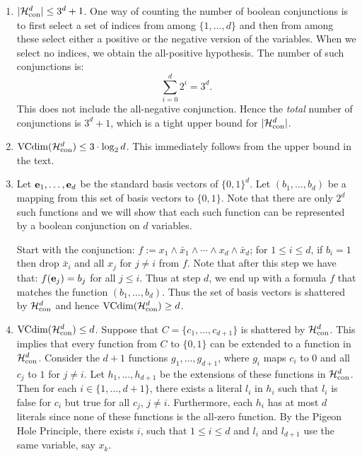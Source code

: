 \begin{enumerate}
    \item $|\mathcal{H}_{\text{con}}^{d}| \leq 3^d + 1$. One way of counting the number of boolean
        conjunctions is to first select a set of indices from among
        $\{1, \ldots, d\}$ and then from among these select either a positive
        or the negative version of the variables. When we select no indices,
        we obtain the all-positive hypothesis. The number of such conjunctions
        is:
        \[
                \sum_{i = 0}^{d} 2^i = 3^d.
        \]
        This does not include the all-negative conjunction. Hence the \emph{total}
        number of conjunctions is $3^d + 1$, which is a tight upper  bound for
        $|\mathcal{H}_{\text{con}}^{d}|$.

    \item $\text{VCdim} (\mathcal{H}_{\text{con}}^{d}) \leq 3 \cdot \log_2 d$. This immediately follows
        from the upper bound in the text.

    \item Let $\mathbf{e}_1, \ldots, \mathbf{e}_d$ be the standard basis vectors of
        $\{0, 1\}^d$. Let $(b_1, \ldots, b_d)$ be a mapping from this set of
        basis vectors to $\{0, 1\}$. Note that there are only $2^d$ such functions
        and we will show that each such function can be represented by a
        boolean conjunction on $d$ variables.

        Start with the conjunction: $f := x_1 \wedge \bar{x}_1 \wedge
        \cdots \wedge x_{d} \wedge \bar{x}_d$; for $1 \leq i \leq d$,
        if $b_i = 1$ then drop $\bar{x}_i$ and all $x_j$ for $j \neq i$ from $f$.
        Note that after this step we have that: $f(\mathbf{e}_j) = b_j$ for all $j \leq i$.
        Thus at step $d$, we end up with a formula $f$ that matches the function
        $(b_1, \ldots, b_d)$.
        Thus the set of basis vectors is shattered by $\mathcal{H}_{\text{con}}^{d}$ and
        hence $\text{VCdim} (\mathcal{H}_{\text{con}}^{d}) \geq d$.

    \item $\text{VCdim} (\mathcal{H}_{\text{con}}^{d}) \leq d$. Suppose that $C = \{c_1, \ldots, c_{d + 1}\}$
        is shattered by $\mathcal{H}_{\text{con}}^{d}$. This implies that every function from $C$ to
        $\{0, 1\}$ can be extended to a function in $\mathcal{H}_{\text{con}}^{d}$. Consider the
        $d + 1$ functions $g_1, \ldots, g_{d + 1}$, where $g_i$ maps $c_i$ to $0$
        and all $c_j$ to $1$ for $j \neq i$. Let $h_1, \ldots, h_{d + 1}$ be the
        extensions of these functions in $\mathcal{H}_{\text{con}}^{d}$. Then for each $i \in
        \{1, \ldots, d+ 1\}$, there exists a literal $l_i$ in $h_i$ such that
        $l_i$ is false for $c_i$ but true for all $c_j$, $j \neq i$. Furthermore,
        each $h_i$ has at most $d$ literals since none of these functions is
        the all-zero function. By the Pigeon Hole Principle, there exists $i$,
        such that $1 \leq i \leq d$ and $l_i$ and $l_{d + 1}$ use the same variable,
        say $x_k$.


\end{enumerate}
